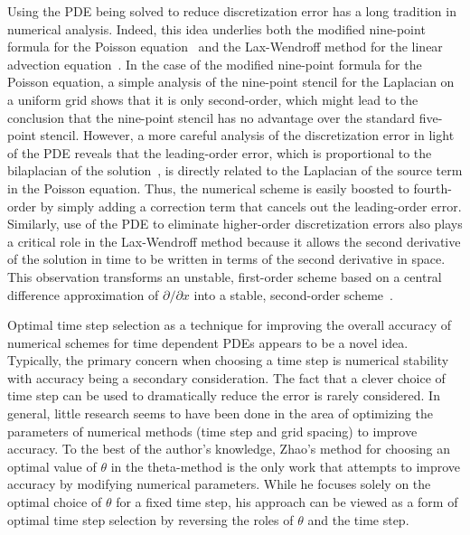 \documentclass[oneeqnum,onefignum,onetabnum,onethmnum]{siamltex}
\begin{document}
Using the PDE being solved to reduce discretization error has a long 
tradition in numerical analysis.  Indeed, this idea underlies both the 
modified nine-point formula for the Poisson equation~\cite{iserles_book} and 
the Lax-Wendroff method for the linear advection 
equation~\cite{leveque_book_1992, leveque_book_2002, gko_book}.  
In the case of the modified nine-point formula for the Poisson equation, a 
simple analysis of the nine-point stencil for the Laplacian on a uniform grid 
shows that it is only second-order, which might lead to the conclusion that 
the nine-point stencil has no advantage over the standard five-point stencil.  
However, a more careful analysis of the discretization error in light of the 
PDE reveals that the leading-order error, which is proportional to the 
bilaplacian of the solution~\cite{iserles_book, patra_2005}, is directly 
related to the Laplacian of the source term in the Poisson equation.  Thus, 
the numerical scheme is easily boosted to fourth-order by simply adding a 
correction term that cancels out the leading-order error.   
Similarly, use of the PDE to eliminate higher-order discretization errors also 
plays a critical role in the Lax-Wendroff method because it allows the second 
derivative of the solution in time to be written in terms of the second 
derivative in space.  This observation transforms an unstable, first-order 
scheme based on a central difference approximation of 
$\partial/\partial x$ into a stable, second-order 
scheme~\cite{leveque_book_1992, leveque_book_2002}.

Optimal time step selection as a technique for improving the overall accuracy 
of numerical schemes for time dependent PDEs appears to be a novel idea.
Typically, the primary concern when choosing a time step is numerical 
stability with accuracy being a secondary consideration.  The fact that a 
clever choice of time step can be used to dramatically reduce the error is 
rarely considered.  In general, little research seems to have been done in
the area of optimizing the parameters of numerical methods (\eg time step and 
grid spacing) to improve accuracy.  To the best of the author's knowledge, 
Zhao's method for choosing an optimal value of $\theta$ in the theta-method is 
the only work that attempts to improve accuracy by modifying numerical 
parameters.  While he focuses solely on the optimal choice of $\theta$ for a 
fixed time step, his approach can be viewed as a form of optimal time step 
selection by reversing the roles of $\theta$ and the time step.  
\end{document}
